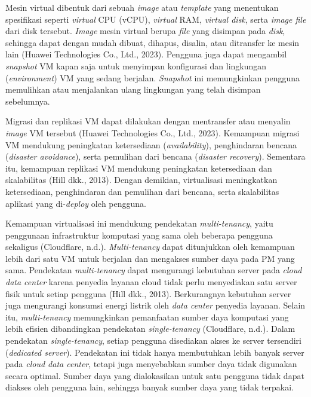 Mesin virtual dibentuk dari sebuah \textit{image} atau \textit{template} yang menentukan spesifikasi seperti \textit{virtual} CPU (vCPU), \textit{virtual} RAM, \textit{virtual disk}, serta \textit{image file} dari disk tersebut. \textit{Image} mesin virtual berupa \textit{file} yang disimpan pada \textit{disk}, sehingga dapat dengan mudah dibuat, dihapus, disalin, atau ditransfer ke mesin lain (Huawei Technologies Co., Ltd., 2023). Pengguna juga dapat mengambil \textit{snapshot} VM kapan saja untuk menyimpan konfigurasi dan lingkungan (\textit{environment}) VM yang sedang berjalan. \textit{Snapshot} ini memungkinkan pengguna memulihkan atau menjalankan ulang lingkungan yang telah disimpan sebelumnya.

Migrasi dan replikasi VM dapat dilakukan dengan mentransfer atau menyalin \textit{image} VM tersebut (Huawei Technologies Co., Ltd., 2023). Kemampuan migrasi VM mendukung peningkatan ketersediaan (\textit{availability}), penghindaran bencana (\textit{disaster avoidance}), serta pemulihan dari bencana (\textit{disaster recovery}). Sementara itu, kemampuan replikasi VM mendukung peningkatan ketersediaan dan skalabilitas (Hill dkk., 2013). Dengan demikian, virtualisasi meningkatkan ketersediaan, penghindaran dan pemulihan dari bencana, serta skalabilitas aplikasi yang di-\textit{deploy} oleh pengguna.

Kemampuan virtualisasi ini mendukung pendekatan \textit{multi-tenancy}, yaitu penggunaan infrastruktur komputasi yang sama oleh beberapa pengguna sekaligus (Cloudflare, n.d.). \textit{Multi-tenancy} dapat ditunjukkan oleh kemampuan lebih dari satu VM untuk berjalan dan mengakses sumber daya pada PM yang sama. Pendekatan \textit{multi-tenancy} dapat mengurangi kebutuhan server pada \textit{cloud data center} karena penyedia layanan cloud tidak perlu menyediakan satu server fisik untuk setiap pengguna (Hill dkk., 2013). Berkurangnya kebutuhan server juga mengurangi konsumsi energi listrik oleh \textit{data center} penyedia layanan. Selain itu, \textit{multi-tenancy} memungkinkan pemanfaatan sumber daya komputasi yang lebih efisien dibandingkan pendekatan \textit{single-tenancy} (Cloudflare, n.d.). Dalam pendekatan \textit{single-tenancy}, setiap pengguna disediakan akses ke server tersendiri (\textit{dedicated server}). Pendekatan ini tidak hanya membutuhkan lebih banyak server pada \textit{cloud data center}, tetapi juga menyebabkan sumber daya tidak digunakan secara optimal. Sumber daya yang dialokasikan untuk satu pengguna tidak dapat diakses oleh pengguna lain, sehingga banyak sumber daya yang tidak terpakai. 

